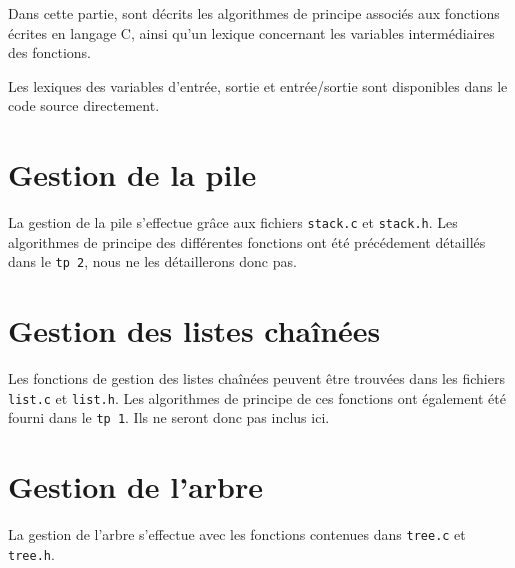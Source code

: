 Dans cette partie, sont décrits les algorithmes de principe associés aux fonctions écrites en langage C, ainsi qu'un lexique concernant les variables intermédiaires des fonctions.

Les lexiques des variables d'entrée, sortie et entrée/sortie sont disponibles dans le code source directement.

\section{Gestion de la pile}
  La gestion de la pile s'effectue grâce aux fichiers \texttt{stack.c} et \texttt{stack.h}.
  Les algorithmes de principe des différentes fonctions ont été précédement détaillés dans le \texttt{tp 2}, nous ne les détaillerons donc pas.

\section{Gestion des listes chaînées}
  Les fonctions de gestion des listes chaînées peuvent être trouvées dans les fichiers \texttt{list.c} et \texttt{list.h}.
  Les algorithmes de principe de ces fonctions ont également été fourni dans le \texttt{tp 1}. Ils ne seront donc pas inclus ici.

\section{Gestion de l'arbre}
  La gestion de l'arbre s'effectue avec les fonctions contenues dans \texttt{tree.c} et \texttt{tree.h}.
    
  \newpage
